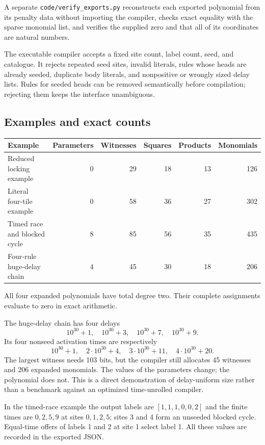 \documentclass[11pt,letterpaper]{article}
\theoremstyle{definition}
\theoremstyle{remark}
\newcommand{\code}[1]{\nolinkurl{#1}}
\begin{document}
A separate \code{code/verify_exports.py} reconstructs each exported
polynomial from its penalty data without importing the compiler, checks
exact equality with the sparse monomial list, and verifies the supplied
zero and that all of its coordinates are natural numbers.

The executable compiler accepts a fixed site count, label count, seed,
and catalogue. It rejects repeated seed sites, invalid literals, rules
whose heads are already seeded, duplicate body literals, and nonpositive
or wrongly sized delay lists. Rules for seeded heads can be removed
semantically before compilation; rejecting them keeps the interface
unambiguous.

\subsection{Examples and exact counts}
\begin{center}\small
\begin{tabular}{lrrrrr}
\toprule
Example & Parameters & Witnesses & Squares & Products & Monomials\\\midrule
Reduced locking example & 0 & 29 & 18 & 13 & 126\\
Literal four-tile example & 0 & 58 & 36 & 27 & 302\\
Timed race and blocked cycle & 8 & 85 & 56 & 35 & 435\\
Four-rule huge-delay chain & 4 & 45 & 30 & 18 & 206\\\bottomrule
\end{tabular}
\end{center}
All four expanded polynomials have total degree two. Their complete
assignments evaluate to zero in exact arithmetic.

The huge-delay chain has four delays
\[
 10^{30}+1,\quad10^{30}+3,\quad10^{30}+7,\quad10^{30}+9.
\]
Its four nonseed activation times are respectively
\[
 10^{30}+1,\quad2\cdot10^{30}+4,\quad
 3\cdot10^{30}+11,\quad4\cdot10^{30}+20.
\]
The largest witness needs 103 bits, but the compiler still allocates 45
witnesses and 206 expanded monomials. The values of the parameters change;
the polynomial does not. This is a direct demonstration of delay-uniform
size rather than a benchmark against an optimized time-unrolled compiler.

In the timed-race example the output labels are $[1,1,1,0,0,2]$ and the
finite times are $0,2,5,9$ at sites $0,1,2,5$; sites 3 and 4 form an
unseeded blocked cycle. Equal-time offers of labels 1 and 2 at site 1
select label 1. All these values are recorded in the exported JSON.
\end{document}
